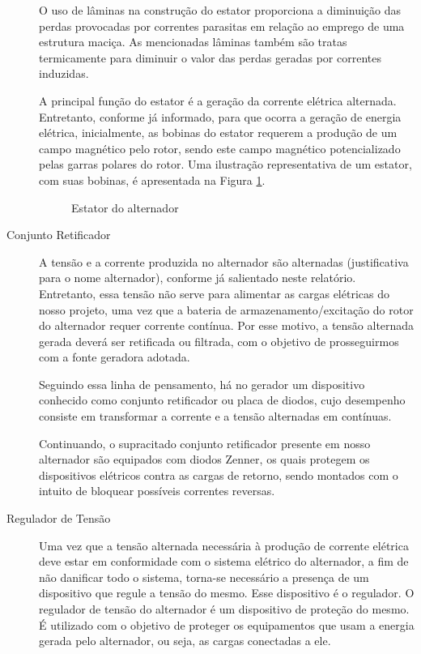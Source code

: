 \begin{description}
O uso de lâminas na construção do estator proporciona a diminuição das perdas provocadas por correntes parasitas em relação ao emprego de uma estrutura maciça. As mencionadas lâminas também são tratas termicamente para diminuir o valor das perdas geradas por correntes induzidas.

A principal função do estator é a geração da corrente elétrica alternada. Entretanto, conforme já informado, para que ocorra a geração de energia elétrica, inicialmente, as bobinas do estator requerem a produção de um campo magnético pelo rotor, sendo este campo magnético potencializado pelas garras polares do rotor. Uma ilustração representativa de um estator, com suas bobinas, é apresentada na Figura \ref{estator-alternador}.

\begin{figure}[h]
	\centering
	\caption{Estator do alternador}
	\label{estator-alternador}
\end{figure}

\item [Conjunto Retificador]

A tensão e a corrente produzida no alternador são alternadas (justificativa para o nome alternador), conforme já salientado neste relatório. Entretanto, essa tensão não serve para alimentar as cargas elétricas do nosso projeto, uma vez que a bateria de armazenamento/excitação do rotor do alternador requer corrente contínua. Por esse motivo, a tensão alternada gerada deverá ser retificada ou filtrada, com o objetivo de prosseguirmos com a fonte geradora adotada.

Seguindo essa linha de pensamento, há no gerador um dispositivo conhecido como conjunto retificador ou placa de diodos, cujo desempenho consiste em transformar a corrente e a tensão alternadas em contínuas.

Continuando, o supracitado conjunto retificador presente em nosso alternador são equipados com diodos Zenner, os quais protegem os dispositivos elétricos contra as cargas de retorno, sendo montados com o intuito de bloquear possíveis correntes reversas.


\item [Regulador de Tensão]

Uma vez que a tensão alternada necessária à produção de corrente elétrica deve estar em conformidade com o sistema elétrico do alternador, a fim de não danificar todo o sistema, torna-se necessário a presença de um dispositivo que regule a tensão do mesmo. Esse dispositivo é o regulador.
O regulador de tensão do alternador é um dispositivo de proteção do mesmo. É utilizado com o objetivo de proteger os equipamentos que usam a energia gerada pelo alternador, ou seja, as cargas conectadas a ele. 


\end{description}
